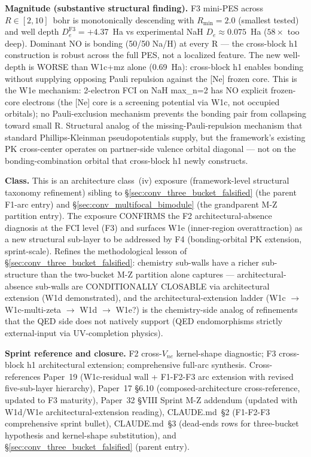 \documentclass[11pt]{article}
\begin{document}
\textbf{Magnitude (substantive structural finding).} F3 mini-PES across
$R \in [2, 10]$~bohr is monotonically descending with $R_\text{min}=2.0$
(smallest tested) and well depth $D_e^\text{F3} = +4.37$~Ha vs experimental
NaH $D_e \approx 0.075$~Ha ($58\times$ too deep). Dominant NO is bonding
(50/50 Na/H) at every R --- the cross-block h1 construction is robust across
the full PES, not a localized feature. The new well-depth is WORSE than
W1c+mz alone (0.69~Ha): cross-block h1 enables bonding without supplying
opposing Pauli repulsion against the [Ne] frozen core. This is the W1e
mechanism: 2-electron FCI on NaH max\_n=2 has NO explicit frozen-core
electrons (the [Ne] core is a screening potential via W1c, not occupied
orbitals); no Pauli-exclusion mechanism prevents the bonding pair from
collapsing toward small R. Structural analog of the missing-Pauli-repulsion
mechanism that standard Phillips-Kleinman pseudopotentials supply, but the
framework's existing PK cross-center operates on partner-side valence
orbital diagonal --- not on the bonding-combination orbital that
cross-block h1 newly constructs.

\textbf{Class.} This is an architecture class~(iv) exposure
(framework-level structural taxonomy refinement) sibling to
\S\ref{sec:conv_three_bucket_falsified} (the parent F1-arc entry) and
\S\ref{sec:conv_multifocal_bimodule} (the grandparent M-Z partition
entry). The exposure CONFIRMS the F2 architectural-absence diagnosis at
the FCI level (F3) and surfaces W1e (inner-region overattraction) as a
new structural sub-layer to be addressed by F4 (bonding-orbital PK
extension, sprint-scale). Refines the methodological lesson of
\S\ref{sec:conv_three_bucket_falsified}: chemistry sub-walls have a
richer sub-structure than the two-bucket M-Z partition alone captures
--- architectural-absence sub-walls are CONDITIONALLY CLOSABLE via
architectural extension (W1d demonstrated), and the architectural-extension
ladder (W1c $\to$ W1c-multi-zeta $\to$ W1d $\to$ W1e?) is the chemistry-side
analog of refinements that the QED side does not natively support
(QED endomorphisms strictly external-input via UV-completion physics).

\textbf{Sprint reference and closure.} F2 cross-$V_{ne}$ kernel-shape
diagnostic; F3
cross-block h1 architectural extension; comprehensive
full-arc synthesis. Cross-references
Paper~19 (W1c-residual wall + F1-F2-F3 arc
extension with revised five-sub-layer hierarchy), Paper~17 \S6.10
(composed-architecture cross-reference, updated to F3 maturity),
Paper~32 \S VIII Sprint M-Z addendum (updated with W1d/W1e
architectural-extension reading), CLAUDE.md~\S2 (F1-F2-F3 comprehensive
sprint bullet), CLAUDE.md~\S3 (dead-ends rows for three-bucket hypothesis
and kernel-shape substitution), and \S\ref{sec:conv_three_bucket_falsified}
(parent entry).
\end{document}

